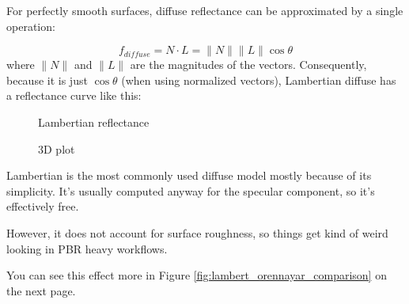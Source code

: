 \documentclass[12pt,letterpaper]{article}
\begin{document}
For perfectly smooth surfaces, diffuse reflectance can be approximated by a single operation:

$$
f_{diffuse} = N \cdot L = \lVert N \rVert \lVert L \rVert \cos \theta
$$
where $\lVert N \rVert$ and $\lVert L \rVert$ are the magnitudes of the vectors. Consequently, 
because it is just $\cos \theta$ (when using normalized vectors), 
Lambertian diffuse has a reflectance curve like this:
\begin{figure}[htbp]
  \begin{minipage}[t]{0.5\linewidth}
    \centering
    \pgfplotsset{width=15em}
    \caption{Lambertian reflectance}
  \end{minipage}
  \hspace{-16pt}
  \begin{minipage}[t]{0.5\linewidth}
    \centering
    \pgfplotsset{width=20em}
    \caption{3D plot}
  \end{minipage}
\end{figure}

Lambertian is the most commonly used diffuse model mostly because of its simplicity. 
It's usually computed anyway for the specular component, so it's effectively free.

However, it does not account for surface roughness, so things get kind of weird looking in PBR heavy workflows.

You can see this effect more in Figure {\color{blue}\ref{fig:lambert_orennayar_comparison}} on the next page.
\end{document}
